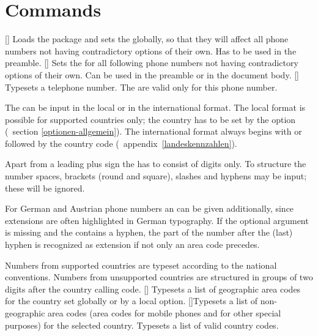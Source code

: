 \documentclass[numbers=noenddot]{scrreprt}
\newcommand*{\vglAbschnitt}[1]{(\cf\ section \ref{#1})}
\newcommand*{\vglAnhang}[1]{(\cf\ appendix~\ref{#1})}
\begin{document}
\section{Commands}
\begin{Befehlsliste}
[]
Loads the package and sets the  globally, so that they will affect all phone numbers not having contradictory options of their own. Has to be used in the preamble.
[]
Sets the  for all following phone numbers not having contradictory options of their own. Can be used in the preamble or in the document body.
[]
Typesets a telephone number. The  are valid only for this phone number.

The  can be input in the local or in the international format. The local format is possible for supported countries only; the country has to be set by the
option
\vglAbschnitt{optionen-allgemein}.
The international format always begins with
\code{+}
or
followed by the country code
\vglAnhang{landeskennzahlen}.

Apart from a leading plus sign the  has to consist of digits only. To structure the number spaces, brackets (round and square), slashes and hyphens may be input; these will be ignored.

For German and Austrian phone numbers an  can be given additionally, since extensions are often highlighted in German typography. If the optional argument is missing and the  contains a hyphen, the part of the number after the (last) hyphen is recognized as extension if not only an area code precedes.

Numbers from supported countries are typeset according to the national conventions. Numbers from unsupported countries are structured in groups of two digits after the country calling code.
[]
Typesets a list of geographic area codes for the country set globally or by a local option.
[]{Typesets a list of non-geographic area codes (area codes for mobile phones and for other special purposes) for the selected country.}
Typesets a list of valid country codes.
\end{Befehlsliste}
\end{document}
